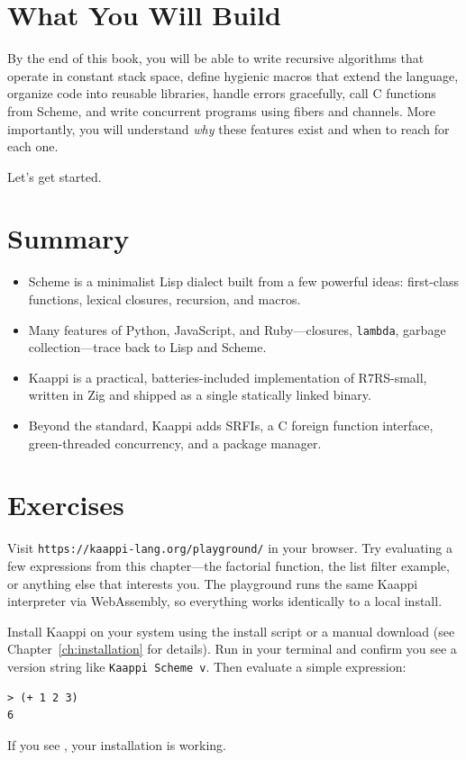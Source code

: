 \section{What You Will Build}

By the end of this book, you will be able to write recursive algorithms that operate in constant stack space, define hygienic macros that extend the language, organize code into reusable libraries, handle errors gracefully, call C functions from Scheme, and write concurrent programs using fibers and channels. More importantly, you will understand \emph{why} these features exist and when to reach for each one.

Let's get started.

\section*{Summary}

\begin{itemize}
    \item Scheme is a minimalist Lisp dialect built from a few powerful ideas: first-class functions, lexical closures, recursion, and macros.
    \item Many features of Python, JavaScript, and Ruby---closures, \texttt{lambda}, garbage collection---trace back to Lisp and Scheme.
    \item Kaappi is a practical, batteries-included implementation of R7RS-small, written in Zig and shipped as a single statically linked binary.
    \item Beyond the standard, Kaappi adds \srfitotal{} SRFIs, a C foreign function interface, green-threaded concurrency, and a package manager.
\end{itemize}

\section*{Exercises}

\begin{exercise}
Visit \texttt{https://kaappi-lang.org/playground/} in your browser. Try evaluating a few expressions from this chapter---the factorial function, the list filter example, or anything else that interests you. The playground runs the same Kaappi interpreter via WebAssembly, so everything works identically to a local install.
\end{exercise}

\begin{exercise}
Install Kaappi on your system using the install script or a manual download (see Chapter~\ref{ch:installation} for details). Run  in your terminal and confirm you see a version string like \texttt{Kaappi Scheme v\kaappiversion}. Then evaluate a simple expression:

\begin{lstlisting}[style=repl]
> (+ 1 2 3)
6
\end{lstlisting}

If you see , your installation is working.
\end{exercise}

